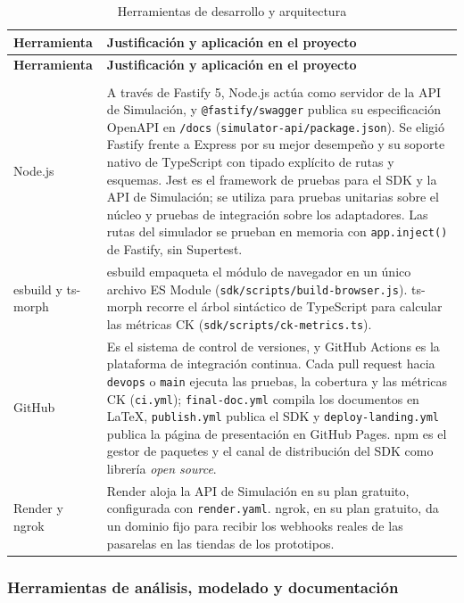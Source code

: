 \begin{center}
\renewcommand{\arraystretch}{1.2}
\begin{longtable}{|P{0.5}|P{0.5}|}
  \hline
  \textbf{Herramienta} & \textbf{Justificación y aplicación en el proyecto} \\
  \hline
  \endfirsthead
  \hline
  \textbf{Herramienta} & \textbf{Justificación y aplicación en el proyecto} \\
  \hline
  \endhead
  \caption{Herramientas de desarrollo y arquitectura}
  \label{tab:herramientas-desarrollo}\\
  \endlastfoot
  Node.js & A través de Fastify 5, Node.js actúa como servidor de la API de Simulación, y \texttt{@fastify/swagger} publica su especificación OpenAPI en \texttt{/docs} (\texttt{simulator-api/package.json}). Se eligió Fastify frente a Express por su mejor desempeño y su soporte nativo de TypeScript con tipado explícito de rutas y esquemas. Jest es el framework de pruebas para el SDK y la API de Simulación; se utiliza para pruebas unitarias sobre el núcleo y pruebas de integración sobre los adaptadores. Las rutas del simulador se prueban en memoria con \texttt{app.inject()} de Fastify, sin Supertest. \\
  \hline
  esbuild y ts-morph & esbuild empaqueta el módulo de navegador en un único archivo ES Module (\texttt{sdk/scripts/build-browser.js}). ts-morph recorre el árbol sintáctico de TypeScript para calcular las métricas CK (\texttt{sdk/scripts/ck-metrics.ts}). \\
  \hline
  GitHub & Es el sistema de control de versiones, y GitHub Actions es la plataforma de integración continua. Cada pull request hacia \texttt{devops} o \texttt{main} ejecuta las pruebas, la cobertura y las métricas CK (\texttt{ci.yml}); \texttt{final-doc.yml} compila los documentos en LaTeX, \texttt{publish.yml} publica el SDK y \texttt{deploy-landing.yml} publica la página de presentación en GitHub Pages. npm es el gestor de paquetes y el canal de distribución del SDK como librería \textit{open source}. \\
  \hline
  Render y ngrok & Render aloja la API de Simulación en su plan gratuito, configurada con \texttt{render.yaml}. ngrok, en su plan gratuito, da un dominio fijo para recibir los webhooks reales de las pasarelas en las tiendas de los prototipos. \\
  \hline
\end{longtable}
\end{center}

\subsubsection{Herramientas de análisis, modelado y documentación}


